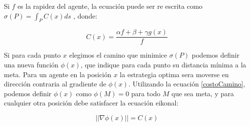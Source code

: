 Si $ f $ es la rapidez del agente, la ecuación puede ser re escrita como $
\sigma(P) = \int_P C(x) ds $ , donde:

\begin{equation} C(x) = \frac{ \alpha f + \beta + \gamma g(x) } { f }
\label{costoCamino}\end{equation} 

Si para cada punto $x$ elegimos el camino que minimice $\sigma(P)$ podemos
definir una nueva función $\phi(x)$, que indique para cada punto su distancia
mínima a la meta. Para un agente en la posición $x$ la estrategia optima sera
moverse en dirección contraria al gradiente de $\phi(x)$. Utilizando la ecuación
\ref{costoCamino}, podemos definir $\phi(x)$ como $\phi(M)=0$ para todo $M$ que
sea meta, y para cualquier otra posición debe satisfacer la ecuación eikonal:

\begin{equation} || \nabla\phi(x) || = C(x)
\label{defphi}\end{equation} 
